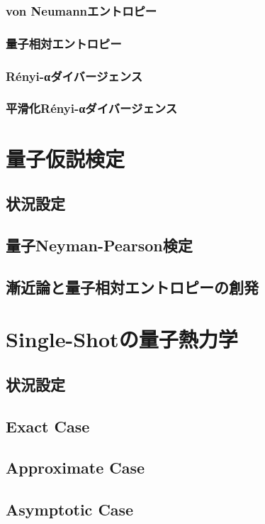 \documentclass[report]{jlreq}
\begin{document}
\subsection{von Neumannエントロピー}
\subsection{量子相対エントロピー}
\subsection{R\'{e}nyi-αダイバージェンス}
\subsection{平滑化R\'{e}nyi-αダイバージェンス}

\chapter{量子仮説検定}
\section{状況設定}
\section{量子Neyman-Pearson検定}
\section{漸近論と量子相対エントロピーの創発}

\chapter{Single-Shotの量子熱力学}
\section{状況設定}
\section{Exact Case}
\section{Approximate Case}
\section{Asymptotic Case}
\end{document}
